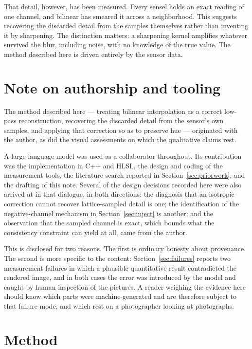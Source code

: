 \documentclass[10pt,a4paper]{article}
\begin{document}
That detail, however, has been measured. Every sensel holds an exact reading of
one channel, and bilinear has smeared it across a neighborhood. This suggests
recovering the discarded detail from the samples themselves rather than
inventing it by sharpening. The distinction matters: a sharpening kernel
amplifies whatever survived the blur, including noise, with no knowledge of the
true value. The method described here is driven entirely by the sensor data.

\section{Note on authorship and tooling}

The method described here --- treating bilinear interpolation as a correct
low-pass reconstruction, recovering the discarded detail from the sensor's own
samples, and applying that correction so as to preserve hue --- originated with
the author, as did the visual assessments on which the qualitative claims rest.

A large language model was used as a collaborator throughout. Its contribution
was the implementation in C++ and HLSL, the design and coding of the
measurement tools, the literature search reported in
Section~\ref{sec:priorwork}, and the drafting of this note. Several of the
design decisions recorded here were also arrived at in that dialogue, in both
directions: the diagnosis that an isotropic correction cannot recover
lattice-sampled detail is one; the identification of the negative-channel
mechanism in Section~\ref{sec:inject} is another; and the observation
that the sampled channel is exact, which bounds what the consistency constraint
can yield at all, came from the author.

This is disclosed for two reasons. The first is ordinary honesty about
provenance. The second is more specific to the content:
Section~\ref{sec:failures} reports two
measurement failures in which a plausible quantitative result contradicted the
rendered image, and in both cases the error was introduced by the model and
caught by human inspection of the pictures. A reader weighing the evidence here
should know which parts were machine-generated and are therefore subject to
that failure mode, and which rest on a photographer looking at photographs.

\section{Method}
\end{document}
